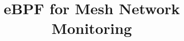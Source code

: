 \documentclass[11pt,a4paper,twoside]{book}
\begin{document}
\title{eBPF for Mesh Network Monitoring}

\beforepreface%




\afterpreface%







%






\end{document}
